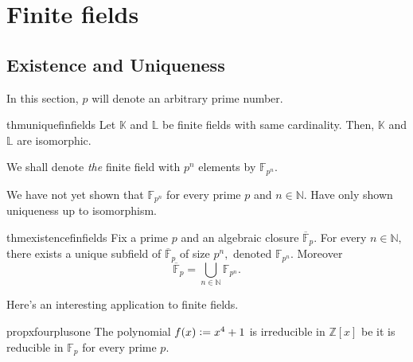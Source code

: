 \chapter{Finite fields}

\section{Existence and Uniqueness}

In this section, $p$ will denote an arbitrary prime number.

\begin{restatable}{thm}{uniquefinfields}
\label{thm:uniquefinfields}
    Let $\mathbb{K}$ and $\mathbb{L}$ be finite fields with same cardinality. Then, $\mathbb{K}$ and $\mathbb{L}$ are isomorphic. \hfill\hyperref[thm:uniquefinfields2]{\downsym}
\end{restatable}

\begin{defn}%
    We shall denote \emph{the} finite field with $p^n$ elements by $\mathbb{F}_{p^n}.$
\end{defn}

\begin{rem}
    We have not yet shown that $\mathbb{F}_{p^n}$ for every prime $p$ and $n \in \mathbb{N}.$ Have only shown uniqueness up to isomorphism.
\end{rem}

\begin{restatable}{thm}{existencefinfields}
\label{thm:existencefinfields}
    Fix a prime $p$ and an algebraic closure $\overline{\mathbb{F}}_p.$ For every $n \in \mathbb{N},$ there exists a unique subfield of $\overline{\mathbb{F}}_p$ of size $p^n,$ denoted $\mathbb{F}_{p^n}.$ Moreover
    \begin{equation*} 
        \overline{\mathbb{F}}_p = \bigcup_{n \in \mathbb{N}} \mathbb{F}_{p^n}.
    \end{equation*}
    \hfill\hyperref[thm:existencefinfields2]{\downsym}
\end{restatable}

Here's an interesting application to finite fields.

\begin{restatable}[]{prop}{xfourplusone}
\label{prop:xfourplusone}
    The polynomial $f(x) \vcentcolon= x^4 + 1$ is irreducible in $\mathbb{Z}[x]$ be it is reducible in $\mathbb{F}_p$ for every prime $p.$ \hfill\hyperref[prop:xfourplusone2]{\downsym}
\end{restatable}

